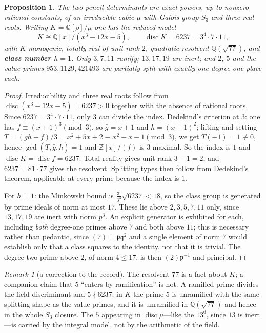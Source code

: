 \documentclass[11pt,reqno]{amsart}
\theoremstyle{plain}
\newtheorem{proposition}[theorem]{Proposition}
\theoremstyle{definition}
\theoremstyle{remark}
\newtheorem{remark}[theorem]{Remark}
\newcommand{\Q}{\mathbb{Q}}
\newcommand{\Z}{\mathbb{Z}}
\newcommand{\disc}{\operatorname{disc}}
\begin{document}
\begin{proposition}\label{prop:mu}
The two pencil determinants are exact powers, up to nonzero rational constants, of an
irreducible cubic $\mu$ with Galois group $S_3$ and three real roots. Writing
$K=\Q[\rho]/\mu$ one has the reduced model
\[
   K\cong\Q[x]/(x^3-12x-5),\qquad \disc K=6237=3^4\cdot7\cdot11,
\]
with $K$ monogenic, totally real of unit rank $2$, quadratic resolvent $\Q(\sqrt{77})$,
and \textbf{class number $h=1$}. Only $3,7,11$ ramify; $13,17,19$ are inert; and $2$,
$5$ and the value primes $953,1129,421493$ are partially split with exactly one
degree-one place each.
\end{proposition}

\begin{proof}
Irreducibility and three real roots follow from $\disc(x^3-12x-5)=6237>0$ together with
the absence of rational roots. Since $6237=3^4\cdot7\cdot11$, only $3$ can divide the
index. Dedekind's criterion at $3$: one has $f\equiv(x+1)^3\pmod3$, so $\bar g=x+1$ and
$\bar h=(x+1)^2$; lifting and setting $T=(gh-f)/3=x^2+5x+2\equiv x^2-x-1\pmod3$, we get
$T(-1)=1\not\equiv0$, hence $\gcd(\bar T,\bar g,\bar h)=1$ and $\Z[x]/(f)$ is
$3$-maximal. So the index is $1$ and $\disc K=\disc f=6237$. Total reality gives unit
rank $3-1=2$, and $6237=81\cdot77$ gives the resolvent. Splitting types then follow from
Dedekind's theorem, applicable at every prime because the index is $1$.

For $h=1$: the Minkowski bound is $\frac{3!}{3^3}\sqrt{6237}<18$, so the class group is
generated by prime ideals of norm at most $17$. These lie above $2,3,5,7,11$ only, since
$13,17,19$ are inert with norm $p^3$. An explicit generator is exhibited for each,
including \emph{both} degree-one primes above $7$ and both above $11$; this is necessary
rather than pedantic, since $(7)=\mathfrak p\mathfrak q^2$ and a single element of norm
$7$ would establish only that a class squares to the identity, not that it is trivial.
The degree-two prime above $2$, of norm $4\le17$, is then $(2)\mathfrak p^{-1}$ and
principal.
\end{proof}

\begin{remark}[a correction to the record]
The resolvent $77$ is a fact about $K$; a companion claim that $5$ ``enters by
ramification'' is not. A ramified prime divides the field discriminant and
$5\nmid6237$; in $K$ the prime $5$ is unramified with the same splitting shape as the
value primes, and it is unramified in $\Q(\sqrt{77})$ and hence in the whole $S_3$
closure. The $5$ appearing in $\disc\mu$---like the $13^6$, since $13$ is inert---is
carried by the integral model, not by the arithmetic of the field.
\end{remark}
\end{document}
